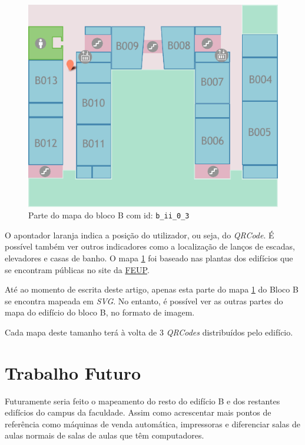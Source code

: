 \documentclass[twocolumn,twoside,11pt]{article}
\newcommand{\svg}{\emph{SVG}}
\newcommand{\qrcode}{\emph{QRCode}}
\newcommand{\qrcodes}{\emph{QRCodes}}
\begin{document}
  \begin{figure}[width=\textwidth]
    \begin{center}
      \includegraphics{map.pdf}
    \end{center}
    \cprotect\caption{Parte do mapa do bloco B com id: \verb+b_ii_0_3+}
    \label{fig:map}
  \end{figure}

  O apontador laranja indica a posição do utilizador, ou seja, do \qrcode.
  É possível também ver outros indicadores como a localização de lanços de escadas, elevadores e casas de banho.
  O mapa \ref{fig:map} foi baseado nas plantas dos edifícios que se encontram públicas no site da \href{http://sigarra.up.pt/feup/pt/instal_geral.edificio_view?pv_id=1407}{FEUP}.

  Até ao momento de escrita deste artigo, apenas esta parte do mapa \ref{fig:map} do Bloco B se encontra mapeada em \svg.
  No entanto, é possível ver as outras partes do mapa do edifício do bloco B, no formato de imagem.

  Cada mapa deste tamanho terá à volta de 3 \qrcodes{} distribuídos pelo edifício.


\section{Trabalho Futuro} %
\label{sec:trabalho_futuro}
  Futuramente seria feito o mapeamento do resto do edifício B e dos restantes edifícios do campus da faculdade.
  Assim como acrescentar mais pontos de referência como máquinas de venda automática, impressoras e diferenciar salas de aulas normais de salas de aulas que têm computadores.
\end{document}
